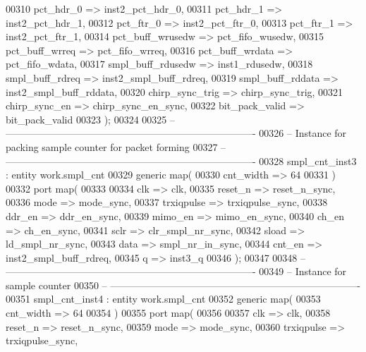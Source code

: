 \begin{DoxyCode}
00310       pct_hdr_0         => inst2_pct_hdr_0,
00311       pct_hdr_1         => inst2_pct_hdr_1,
00312         pct_ftr_0         => inst2_pct_ftr_0,
00313       pct_ftr_1         => inst2_pct_ftr_1,
00314       pct_buff_wrusedw  => pct_fifo_wusedw,
00315       pct_buff_wrreq    => pct_fifo_wrreq,
00316       pct_buff_wrdata   => pct_fifo_wdata,
00317       smpl_buff_rdusedw => inst1_rdusedw,
00318       smpl_buff_rdreq   => inst2_smpl_buff_rdreq,
00319       smpl_buff_rddata  => inst2_smpl_buff_rddata,
00320         chirp_sync_trig   => chirp_sync_trig,
00321         chirp_sync_en       => chirp_sync_en_sync,
00322         bit_pack_valid      => bit_pack_valid
00323         \textcolor{vhdlchar}{)};
00324         
00325 \textcolor{keyword}{-- ----------------------------------------------------------------------------}
00326 \textcolor{keyword}{-- Instance for packing sample counter for packet forming}
00327 \textcolor{keyword}{-- ----------------------------------------------------------------------------        }
00328 smpl\_cnt\_inst3 : \textcolor{keywordflow}{entity} work.smpl_cnt
00329    \textcolor{keywordflow}{generic} \textcolor{keywordflow}{map}(
00330       cnt_width   => \textcolor{vhdllogic}{64}
00331    \textcolor{vhdlchar}{)}
00332    \textcolor{keywordflow}{port} \textcolor{keywordflow}{map}(
00333 
00334       clk         => clk,
00335       reset_n     => reset_n_sync,
00336       mode        => mode_sync,
00337       trxiqpulse  => trxiqpulse_sync,
00338       ddr_en      => ddr_en_sync,
00339       mimo_en     => mimo_en_sync,
00340       ch_en       => ch_en_sync,
00341       sclr        => clr_smpl_nr_sync,
00342       sload       => ld_smpl_nr_sync,
00343       data        => smpl_nr_in_sync,
00344       cnt_en      => inst2_smpl_buff_rdreq,
00345       q           => inst3_q        
00346         \textcolor{vhdlchar}{)};
00347  
00348 \textcolor{keyword}{-- ----------------------------------------------------------------------------}
00349 \textcolor{keyword}{-- Instance for sample counter}
00350 \textcolor{keyword}{-- ----------------------------------------------------------------------------        }
00351 smpl\_cnt\_inst4 : \textcolor{keywordflow}{entity} work.smpl_cnt
00352    \textcolor{keywordflow}{generic} \textcolor{keywordflow}{map}(
00353       cnt_width   => \textcolor{vhdllogic}{64}
00354    \textcolor{vhdlchar}{)}
00355    \textcolor{keywordflow}{port} \textcolor{keywordflow}{map}(
00356 
00357       clk         => clk,
00358       reset_n     => reset_n_sync,
00359       mode        => mode_sync,
00360       trxiqpulse  => trxiqpulse_sync,

\end{DoxyCode}
